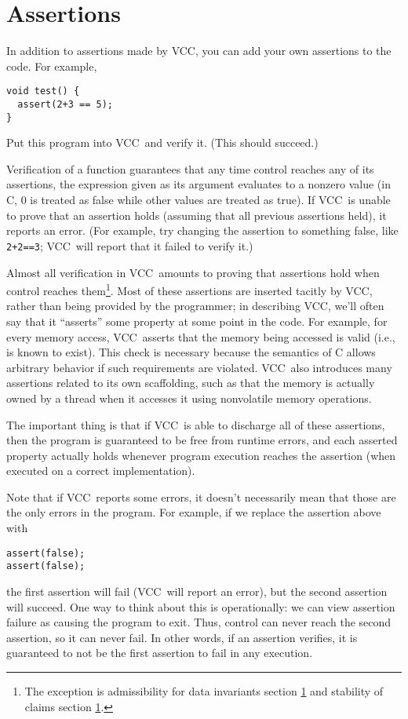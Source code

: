 \documentclass{report}
\newcommand{\Q}[1]{\lstinline~#1~}
\newcommand{\VCC}{VCC}
\newcommand{\Ref}[1]{section \ref{#1}}
\begin{document}
\section{Assertions}

In addition to assertions made by \VCC, you can add your own
assertions to the code. For example,
\begin{lstlisting}
void test() {
  assert(2+3 == 5);
}
\end{lstlisting}
Put this program into \VCC\ and verify it. (This should succeed.)

Verification of a function guarantees that any time control reaches
any of its assertions, the expression given as its argument evaluates
to a nonzero value (in C, 0 is treated as false while other values are
treated as true). If \VCC\ is unable to prove that an assertion holds
(assuming that all previous assertions held), it reports an
error. (For example, try changing the assertion to something false,
like \Q{2+2==3}; \VCC\ will report that it failed to verify it.)

Almost all verification in \VCC\ amounts to proving that assertions
hold when control reaches them\footnote{The exception is admissibility
  for data invariants \Ref{} and stability of claims \Ref{}.}. Most of
these assertions are inserted tacitly by \VCC, rather than being
provided by the programmer; in describing \VCC, we'll often say that
it ``asserts'' some property at some point in the code. For example,
for every memory access, \VCC\ asserts that the memory being accessed
is valid (i.e., is known to exist). This check is necessary because
the semantics of C allows arbitrary behavior if such requirements are
violated. \VCC\ also introduces many assertions related to its own
scaffolding, such as that the memory is actually owned by a thread
when it accesses it using nonvolatile memory operations.

The important thing is that if \VCC\ is able to discharge all of these
assertions, then the program is guaranteed to be free from runtime
errors, and each asserted property actually holds whenever program
execution reaches the assertion (when executed on a correct
implementation).

Note that if \VCC\ reports some errors, it doesn't necessarily mean that
those are the only errors in the program. For example, if we replace
the assertion above with
\begin{lstlisting}
assert(false); 
assert(false); 
\end{lstlisting}
the first assertion will fail (\VCC\ will report an error), but the
second assertion will succeed. One way to think about this is
operationally: we can view assertion failure as causing the program to
exit.  Thus, control can never reach the second assertion, so it can
never fail. In other words, if an assertion verifies, it is guaranteed
to not be the first assertion to fail in any execution.
\end{document}
